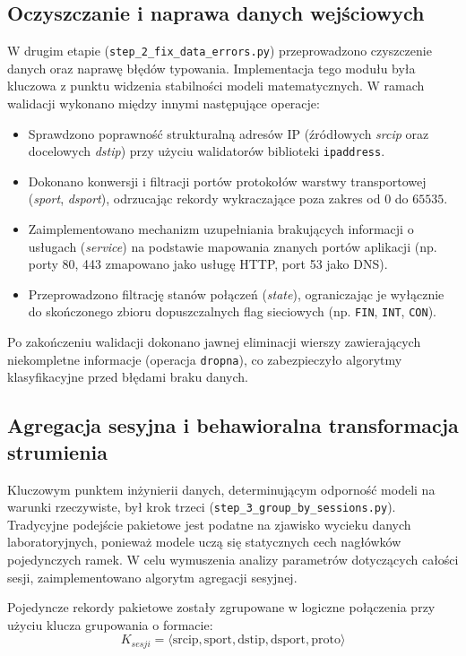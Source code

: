 \documentclass[12pt,twoside]{article}
\begin{document}
\subsection{Oczyszczanie i naprawa danych wejściowych}

W drugim etapie (\texttt{step\_2\_fix\_data\_errors.py}) przeprowadzono czyszczenie danych oraz naprawę błędów typowania. 
Implementacja tego modułu była kluczowa z punktu widzenia stabilności modeli matematycznych. 
W ramach walidacji wykonano między innymi następujące operacje:
\begin{itemize}
	\item Sprawdzono poprawność strukturalną adresów IP (źródłowych \emph{srcip} oraz docelowych \emph{dstip}) przy użyciu walidatorów biblioteki \texttt{ipaddress}.
	\item Dokonano konwersji i filtracji portów protokołów warstwy transportowej (\emph{sport}, \emph{dsport}), odrzucając rekordy wykraczające poza zakres od $0$ do $65535$.
	\item Zaimplementowano mechanizm uzupełniania brakujących informacji o usługach (\emph{service}) na podstawie mapowania znanych portów aplikacji (np. porty 80, 443 zmapowano jako usługę HTTP, port 53 jako DNS).
	\item Przeprowadzono filtrację stanów połączeń (\emph{state}), ograniczając je wyłącznie do skończonego zbioru dopuszczalnych flag sieciowych (np. \texttt{FIN}, \texttt{INT}, \texttt{CON}).
\end{itemize}
Po zakończeniu walidacji dokonano jawnej eliminacji wierszy zawierających niekompletne informacje (operacja \texttt{dropna}), co zabezpieczyło algorytmy klasyfikacyjne przed błędami braku danych.

\subsection{Agregacja sesyjna i behawioralna transformacja strumienia}

Kluczowym punktem inżynierii danych, determinującym odporność modeli na warunki rzeczywiste, był krok trzeci (\texttt{step\_3\_group\_by\_sessions.py}). 
Tradycyjne podejście pakietowe jest podatne na zjawisko wycieku danych laboratoryjnych, ponieważ modele uczą się statycznych cech nagłówków pojedynczych ramek. 
W celu wymuszenia analizy parametrów dotyczących całości sesji, zaimplementowano algorytm agregacji sesyjnej.

Pojedyncze rekordy pakietowe zostały zgrupowane w logiczne połączenia przy użyciu klucza grupowania o formacie:
\begin{equation}
	K_{sesji} = \langle \text{srcip}, \text{sport}, \text{dstip}, \text{dsport}, \text{proto} \rangle
\end{equation}
\end{document}

